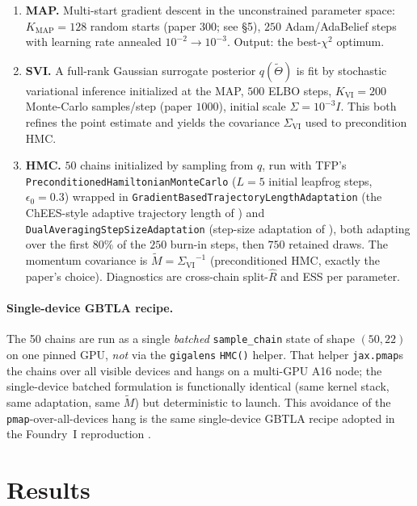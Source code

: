 \documentclass[11pt,letterpaper]{article}
\newcommand{\Rhat}{\ensuremath{\hat{R}}}
\newcommand{\SigmaVI}{\ensuremath{\Sigma_{\mathrm{VI}}}}
\begin{document}
\begin{enumerate}
\item \textbf{MAP.} Multi-start gradient descent in the unconstrained
      parameter space: $K_{\mathrm{MAP}}=128$ random starts (paper $300$;
      see \S5), $250$ Adam/AdaBelief steps with learning rate annealed
      $10^{-2}\!\to\!10^{-3}$. Output: the best-$\chi^2$ optimum.
\item \textbf{SVI.} A full-rank Gaussian surrogate posterior $q(\tilde\Theta)$
      is fit by stochastic variational inference initialized at the MAP,
      $500$ ELBO steps, $K_{\mathrm{VI}}=200$ Monte-Carlo samples/step
      (paper $1000$), initial scale $\Sigma=10^{-3}I$. This both refines the
      point estimate and yields the covariance $\SigmaVI$ used to
      precondition HMC.
\item \textbf{HMC.} $50$ chains initialized by sampling from $q$, run with
      TFP's \texttt{PreconditionedHamiltonianMonteCarlo}
      ($L=5$ initial leapfrog steps, $\epsilon_0=0.3$) wrapped in
      \texttt{GradientBasedTrajectoryLengthAdaptation} (the ChEES-style
      adaptive trajectory length of \citealt{hoffman2021chees}) and
      \texttt{DualAveragingStepSizeAdaptation} (step-size adaptation of
      \citealt{hoffman2014nuts}), both adapting over the first $80\%$ of the
      $250$ burn-in steps, then $750$ retained draws. The momentum
      covariance is $\tilde{M}=\SigmaVI^{-1}$ (preconditioned HMC, exactly
      the paper's choice). Diagnostics are cross-chain split-$\Rhat$ and ESS
      per parameter.
\end{enumerate}

\paragraph{Single-device GBTLA recipe.} The 50 chains are run as a single
\emph{batched} \texttt{sample\_chain} state of shape $(50,22)$ on one pinned
GPU, \emph{not} via the \texttt{gigalens} \texttt{HMC()} helper. That helper
\texttt{jax.pmap}s the chains over all visible devices and hangs on a
multi-GPU A16 node; the single-device batched formulation is functionally
identical (same kernel stack, same adaptation, same $\tilde{M}$) but
deterministic to launch. This avoidance of the \texttt{pmap}-over-all-devices
hang is the same single-device GBTLA recipe adopted in the Foundry~I
reproduction \citep{huang2025foundry1}.

\section{Results}
\end{document}
